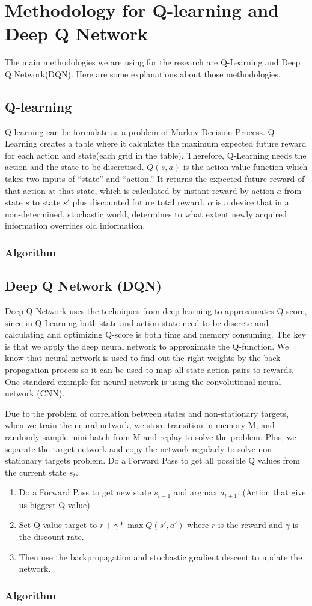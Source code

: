 \chapter{Methodology for Q-learning and Deep Q Network}
\label{Ch:methodology}

The main methodologies we are using for the research are Q-Learning and Deep Q Network(DQN). Here are some explanations about those methodologies.

\section{Q-learning}
Q-learning can be formulate as a problem of Markov Decision Process. Q-Learning creates a table where it calculates the maximum expected future reward for each action and state(each grid in the table). Therefore, Q-Learning needs the action and the state to be discretised. $Q(s,a)$ is the action value function which takes two inputs of “state” and “action.” It returns the expected future reward of that action at that state, which is calculated by instant reward by action $a$ from state $s$ to state $s'$ plus discounted future total reward. $\alpha$ is a device that in a non-determined, stochastic world, determines to what extent newly acquired information overrides old information.

\subsection{Algorithm}

\section{Deep Q Network (DQN)}
Deep Q Network uses the techniques from deep learning to approximates Q-score, since in Q-Learning both state and action state need to be discrete and calculating and optimizing Q-score is both time and memory consuming. The key is that we apply the deep neural network to approximate the Q-function. We know that neural network is used to find out the right weights by the back propagation process so it can be used to map all state-action pairs to rewards. One standard example for neural network is using the convolutional neural network (CNN). 

Due to the problem of correlation between states and non-stationary targets, when we train the neural network, we store transition in memory M, and randomly sample mini-batch from M and replay to solve the problem. Plus, we separate the target network and copy the network regularly to solve non-stationary targets problem. Do a Forward Pass to get all possible Q values from the current state $s_t$.
\begin{enumerate}{}
\item Do a Forward Pass to get new state $s_{t+1}$ and argmax $a_{t+1}$. (Action that give us biggest Q-value)
\item Set Q-value target to $r+\gamma * \max Q(s',a')$ where $r$ is the reward and $\gamma$ is the discount rate.
\item Then use the backpropagation and stochastic gradient descent to update the network.
\end{enumerate}

\subsection{Algorithm}